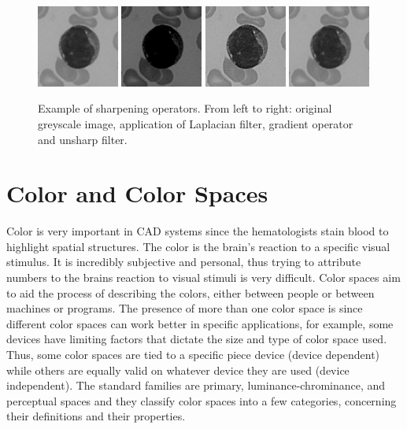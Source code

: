 \documentclass[final,a4paper,12pt,english]{UnicaPhdThesis3}
\begin{document}
\begin{figure}[!h]
	\centering
	\includegraphics[width=0.24\textwidth]{images/smooth0}
	\includegraphics[width=0.24\textwidth]{images/sharpen1}
	\includegraphics[width=0.24\textwidth]{images/sharpen2}
	\includegraphics[width=0.24\textwidth]{images/sharpen3}
	\caption{\label{fig:sharpening}Example of sharpening operators. From left to right: original greyscale image, application of Laplacian filter, gradient operator and unsharp filter.}
\end{figure}

\section{Color and Color Spaces} 
Color is very important in CAD systems since the hematologists stain blood to highlight spatial structures. The color is the brain's reaction to a specific visual stimulus. It is incredibly subjective and personal, thus trying to attribute numbers to the brains reaction to visual stimuli is very difficult. Color spaces aim to aid the process of describing the colors, either between people or between machines or programs. The presence of more than one color space is since different color spaces can work better in specific applications, for example, some devices have limiting factors that dictate the size and type of color space used. Thus, some color spaces are tied to a specific piece device (device dependent) while others are equally valid on whatever device they are used (device independent). The standard families are primary, luminance-chrominance, and perceptual spaces  \cite{Vandenbroucke, Busin} and they classify color spaces into a few categories, concerning their definitions and their properties.
\end{document}
